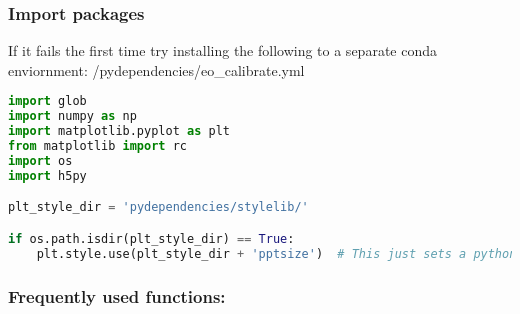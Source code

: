 \subsubsection{Import packages}\label{import-packages}

If it fails the first time try installing the following to a separate
conda enviornment: {/pydependencies/eo\_calibrate.yml}

\begin{lstlisting}[frame=single, language=Python]
import glob
import numpy as np
import matplotlib.pyplot as plt
from matplotlib import rc
import os
import h5py

plt_style_dir = 'pydependencies/stylelib/'

if os.path.isdir(plt_style_dir) == True:
    plt.style.use(plt_style_dir + 'pptsize')  # This just sets a python figure style (you can adjust it to your preferences)
\end{lstlisting}

\subsubsection{Frequently used
functions:}\label{frequently-used-functions}

